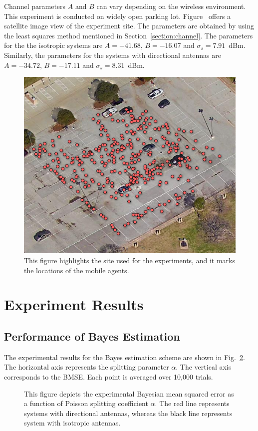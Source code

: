 Channel parameters $A$ and $B$ can vary depending on the wireless environment.
This experiment is conducted on widely open parking lot.
Figure~\label{figure:Googlemap} offers a satellite image view of the experiment site.
The parameters are obtained by using the least squares method mentioned in Section~\ref{section:channel}.
The parameters for the the isotropic systems are $A = -41.68$, $B = -16.07$ and $\sigma_{s} = 7.91$~dBm.
Similarly, the parameters for the systems with directional antennas are $A = -34.72$, $B = -17.11$ and $\sigma_{s} = 8.31$~dBm.
\begin{figure}[]
	\centering
	\includegraphics[scale=1]{Figures/Googlemap.png}
	\caption{This figure highlights the site used for the experiments, and it marks the locations of the mobile agents.}
	\label{figure:Googlemap}
\end{figure}


\section{Experiment Results}
\subsection{Performance of Bayes Estimation}

The experimental results for the Bayes estimation scheme are shown in Fig.~\ref{figure: bayesex}.
The horizontal axis represents the splitting parameter $\alpha$.
The vertical axis corresponds to the BMSE.
Each point is averaged over 10,000 trials.
\begin{figure}[]
	\centerline{}
	\caption{This figure depicts the experimental Bayesian mean squared error as a function of Poisson splitting coefficient $\alpha$.
		The red line represents systems with directional antennas, whereas the black line represents system with isotropic antennas.}
	\label{figure: bayesex}
\end{figure}

